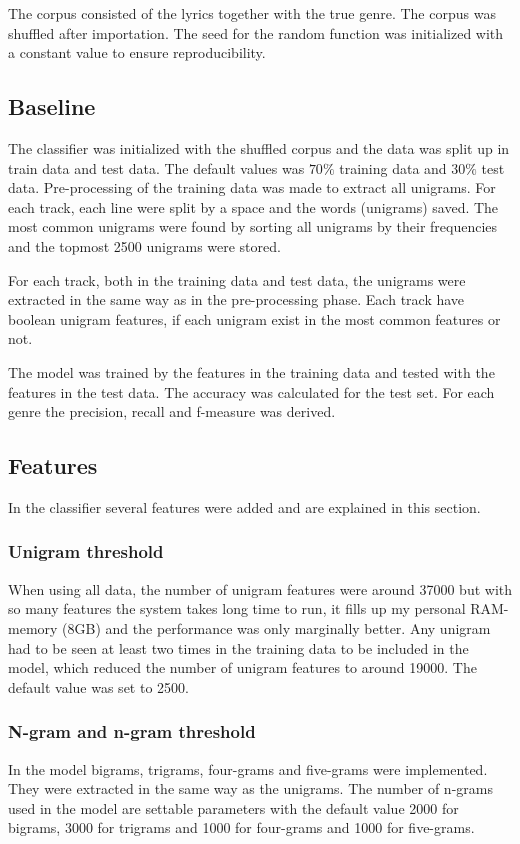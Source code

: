 \documentclass[a4paper, 12pt]{article}
\begin{document}
The corpus consisted of the lyrics together with the true genre.
The corpus was shuffled after importation.
The seed for the random function was initialized with a constant value to ensure reproducibility.

\subsection{Baseline}
\label{sec:baseline}
The classifier was initialized with the shuffled corpus and the data was split up in train data and test data.
The default values was $70\%$ training data and $30\%$ test data.
Pre-processing of the training data was made to extract all unigrams.
For each track, each line were split by a space and the words (unigrams) saved.
The most common unigrams were found by sorting all unigrams by their frequencies and the topmost 2500 unigrams were stored.

For each track, both in the training data and test data, the unigrams were extracted in the same way as in the pre-processing phase.
Each track have boolean unigram features, if each unigram exist in the most common features or not.

The model was trained by the features in the training data and tested with the features in the test data.
The accuracy was calculated for the test set.
For each genre the precision, recall and f-measure was derived.

\subsection{Features}
\label{sec:feat}
In the classifier several features were added and are explained in this section.

\subsubsection*{Unigram threshold}
When using all data, the number of unigram features were around 37000 but with so many features the system takes long time to run, it fills up my personal RAM-memory (8GB) and the performance was only marginally better.
Any unigram had to be seen at least two times in the training data to be included in the model, which reduced the number of unigram features to around 19000.
The default value was set to 2500.

\pagebreak
\subsubsection*{N-gram and n-gram threshold}
In the model bigrams, trigrams, four-grams and five-grams were implemented.
They were extracted in the same way as the unigrams.
The number of n-grams used in the model are settable parameters with the default value 2000 for bigrams, 3000 for trigrams and 1000 for four-grams and 1000 for five-grams.
\end{document}

